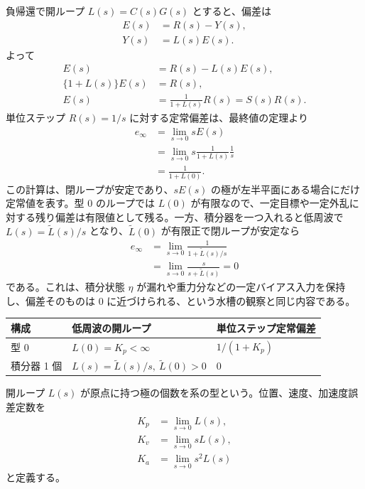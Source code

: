 負帰還で開ループ $L(s)=C(s)G(s)$ とすると、偏差は
\begin{align}
  E(s)&=R(s)-Y(s),\\
  Y(s)&=L(s)E(s).
\end{align}
よって
\begin{align}
  E(s)&=R(s)-L(s)E(s),\\
  \{1+L(s)\}E(s)&=R(s),\\
  E(s)&=\frac{1}{1+L(s)}R(s)=S(s)R(s).
\end{align}
単位ステップ $R(s)=1/s$ に対する定常偏差は、最終値の定理より
\begin{align}
  e_\infty&=\lim_{s\to0}sE(s)\\
  &=\lim_{s\to0}s\frac{1}{1+L(s)}\frac{1}{s}\\
  &=\frac{1}{1+L(0)}.
\end{align}
この計算は、閉ループが安定であり、$sE(s)$ の極が左半平面にある場合にだけ定常値を表す。型 0 のループでは $L(0)$ が有限なので、一定目標や一定外乱に対する残り偏差は有限値として残る。一方、積分器を一つ入れると低周波で $L(s)=\tilde{L}(s)/s$ となり、$\tilde{L}(0)$ が有限正で閉ループが安定なら
\begin{align}
  e_\infty
  &=\lim_{s\to0}\frac{1}{1+\tilde{L}(s)/s}\\
  &=\lim_{s\to0}\frac{s}{s+\tilde{L}(s)}=0
\end{align}
である。これは、積分状態 $\eta$ が漏れや重力分などの一定バイアス入力を保持し、偏差そのものは 0 に近づけられる、という水槽の観察と同じ内容である。

\begin{center}
\begin{tabular}{lll}
\hline
構成 & 低周波の開ループ & 単位ステップ定常偏差 \\
\hline
型 0 & $L(0)=K_p<\infty$ & $1/(1+K_p)$ \\
積分器 1 個 & $L(s)=\tilde{L}(s)/s,\ \tilde{L}(0)>0$ & $0$ \\
\hline
\end{tabular}
\end{center}

\begin{definition}[型と誤差定数]
開ループ $L(s)$ が原点に持つ極の個数を系の型という。位置、速度、加速度誤差定数を
\begin{align}
  K_p&=\lim_{s\to0}L(s),\\
  K_v&=\lim_{s\to0}sL(s),\\
  K_a&=\lim_{s\to0}s^2L(s)
\end{align}
と定義する。
\end{definition}

